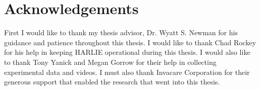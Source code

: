 \section*{Acknowledgements}

First I would like to thank my thesis advisor, Dr. Wyatt S. Newman for his guidance and patience throughout this thesis. I would like to thank Chad Rockey for his help in keeping HARLIE operational during this thesis. I would also like to thank Tony Yanick and Megan Gorrow for their help in collecting experimental data and videos. I must also thank Invacare Corporation for their generous support that enabled the research that went into this thesis.